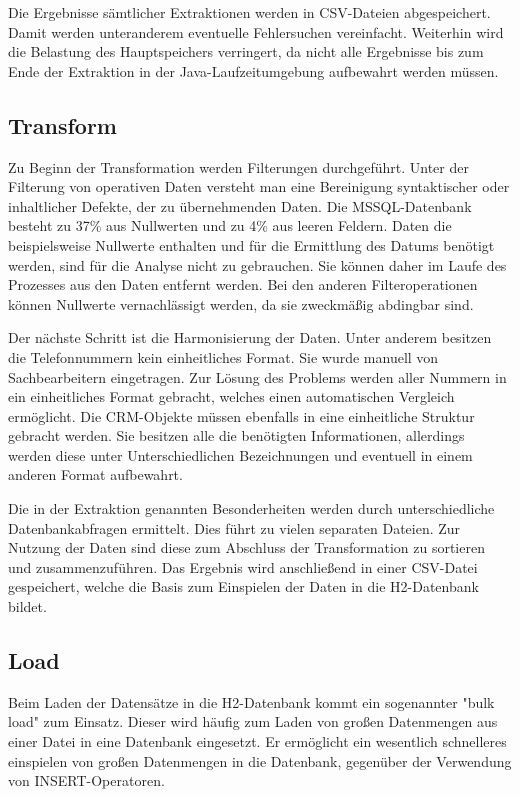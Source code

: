 Die Ergebnisse sämtlicher Extraktionen werden in CSV-Dateien abgespeichert. Damit werden unteranderem eventuelle Fehlersuchen vereinfacht. Weiterhin wird die Belastung des Hauptspeichers verringert, da nicht alle Ergebnisse bis zum Ende der Extraktion in der Java-Laufzeitumgebung aufbewahrt werden müssen.

\subsection{Transform}

Zu Beginn der Transformation werden Filterungen durchgeführt. Unter der Filterung von operativen Daten versteht man eine Bereinigung syntaktischer oder inhaltlicher Defekte, der zu übernehmenden Daten. Die MSSQL-Datenbank besteht zu 37\% aus Nullwerten und zu 4\% aus leeren Feldern. Daten die beispielsweise Nullwerte enthalten und für die Ermittlung des Datums benötigt werden, sind für die Analyse nicht zu gebrauchen. Sie können daher im Laufe des Prozesses aus den Daten entfernt werden. Bei den anderen Filteroperationen können Nullwerte vernachlässigt werden, da sie zweckmäßig abdingbar sind.

Der nächste Schritt ist die Harmonisierung der Daten. Unter anderem besitzen die Telefonnummern kein einheitliches Format. Sie wurde manuell von Sachbearbeitern eingetragen. Zur Lösung des Problems werden aller Nummern in ein einheitliches Format gebracht, welches einen automatischen Vergleich ermöglicht. Die CRM-Objekte müssen ebenfalls in eine einheitliche Struktur gebracht werden. Sie besitzen alle die benötigten Informationen, allerdings werden diese unter Unterschiedlichen Bezeichnungen und eventuell in einem anderen Format aufbewahrt.

Die in der Extraktion genannten Besonderheiten werden durch unterschiedliche Datenbankabfragen ermittelt. Dies führt zu vielen separaten Dateien. Zur Nutzung der Daten sind diese zum Abschluss der Transformation zu sortieren und zusammenzuführen. Das Ergebnis wird anschließend in einer CSV-Datei gespeichert, welche die Basis zum Einspielen der Daten in die H2-Datenbank bildet. 

\subsection{Load}

Beim Laden der Datensätze in die H2-Datenbank kommt ein sogenannter "bulk load" zum Einsatz. Dieser wird häufig zum Laden von großen Datenmengen aus einer Datei in eine Datenbank eingesetzt. Er ermöglicht ein wesentlich schnelleres einspielen von großen Datenmengen in die Datenbank, gegenüber der Verwendung von INSERT-Operatoren.

